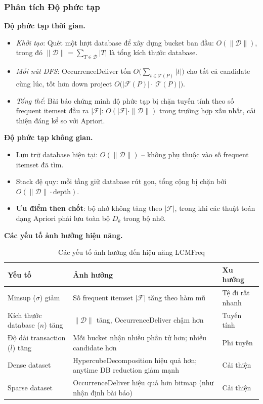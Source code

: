 \documentclass[12pt,a4paper]{article}
\theoremstyle{definition}
\begin{document}
\subsubsection{Phân tích Độ phức tạp}

\textbf{Độ phức tạp thời gian.}
\begin{itemize}
    \item \textit{Khởi tạo}: Quét một lượt database để xây dựng bucket ban đầu: $O(\|\mathcal{D}\|)$, trong đó $\|\mathcal{D}\| = \sum_{T \in \mathcal{D}} |T|$ là tổng kích thước database.
    \item \textit{Mỗi nút DFS}: OccurrenceDeliver tốn $O\bigl(\sum_{t \in \mathcal{T}(P)} |t|\bigr)$ cho tất cả candidate cùng lúc, tốt hơn down project $O\bigl(|\mathcal{F}(P)| \cdot |\mathcal{T}(P)|\bigr)$.
    \item \textit{Tổng thể}: Bài báo chứng minh độ phức tạp bị chặn tuyến tính theo số frequent itemset đầu ra $|\mathcal{F}|$: $O(|\mathcal{F}| \cdot \|\mathcal{D}\|)$ trong trường hợp xấu nhất, cải thiện đáng kể so với Apriori.
\end{itemize}

\textbf{Độ phức tạp không gian.}
\begin{itemize}
    \item Lưu trữ database hiện tại: $O(\|\mathcal{D}\|)$ -- không phụ thuộc vào số frequent itemset đã tìm.
    \item Stack đệ quy: mỗi tầng giữ database rút gọn, tổng cộng bị chặn bởi $O(\|\mathcal{D}\| \cdot \mathrm{depth})$.
    \item \textbf{Ưu điểm then chốt}: bộ nhớ không tăng theo $|\mathcal{F}|$, trong khi các thuật toán dạng Apriori phải lưu toàn bộ $D_k$ trong bộ nhớ.
\end{itemize}

\textbf{Các yếu tố ảnh hưởng hiệu năng.}

\begin{table}[H]
\centering
\small
\begin{tabular}{l p{6cm} l}
    \toprule
    \textbf{Yếu tố} & \textbf{Ảnh hưởng} & \textbf{Xu hướng} \\
    \midrule
    Minsup ($\sigma$) giảm & Số frequent itemset $|\mathcal{F}|$ tăng theo hàm mũ & Tệ đi rất nhanh \\
    Kích thước database ($n$) tăng & $\|\mathcal{D}\|$ tăng, OccurrenceDeliver chậm hơn & Tuyến tính \\
    Độ dài transaction ($\bar{l}$) tăng & Mỗi bucket nhận nhiều phần tử hơn; nhiều candidate hơn & Phi tuyến \\
    Dense dataset & HypercubeDecomposition hiệu quả hơn; anytime DB reduction giảm mạnh & Cải thiện \\
    Sparse dataset & OccurrenceDeliver hiệu quả hơn bitmap (như nhận định bài báo) & Cải thiện \\
    \bottomrule
\end{tabular}
\caption{Các yếu tố ảnh hưởng đến hiệu năng LCMFreq}
\label{tab:complexity_factors}
\end{table}
\end{document}
